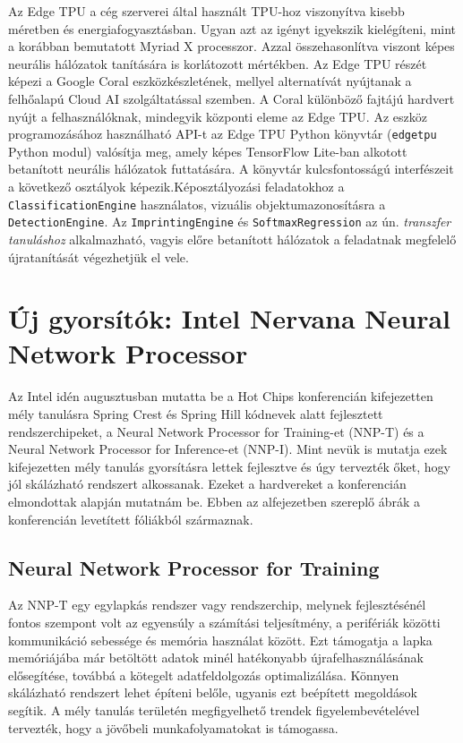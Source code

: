Az Edge TPU a cég szerverei által használt TPU-hoz viszonyítva kisebb méretben és energiafogyasztásban. Ugyan azt az igényt igyekszik kielégíteni, mint a korábban bemutatott Myriad X processzor. Azzal összehasonlítva viszont képes neurális hálózatok tanítására is korlátozott mértékben. Az Edge TPU részét képezi a Google Coral eszközkészletének, mellyel alternatívát nyújtanak a felhőalapú Cloud AI szolgáltatással szemben. A Coral különböző fajtájú hardvert nyújt a felhasználóknak, mindegyik központi eleme az Edge TPU. Az eszköz programozásához használható API-t az Edge TPU Python könyvtár (\verb|edgetpu| Python modul) valósítja meg, amely képes TensorFlow Lite-ban alkotott betanított neurális hálózatok futtatására. A könyvtár kulcsfontosságú interfészeit a következő osztályok képezik.Képosztályozási feladatokhoz a \verb|ClassificationEngine| használatos, vizuális objektumazonosításra a \verb|DetectionEngine|. Az \verb|ImprintingEngine| és \verb|SoftmaxRegression| az ún. \emph{transzfer tanuláshoz} alkalmazható, vagyis előre betanított hálózatok a feladatnak megfelelő újratanítását végezhetjük el vele.


\section{Új gyorsítók: Intel Nervana Neural Network Processor}

Az Intel idén augusztusban mutatta be a Hot Chips konferencián kifejezetten mély tanulásra Spring Crest és Spring Hill kódnevek alatt fejlesztett  rendszerchipeket, a Neural Network Processor for Training-et (NNP-T) és a Neural Network Processor for Inference-et (NNP-I). Mint nevük is mutatja ezek kifejezetten mély tanulás gyorsításra lettek fejlesztve és úgy tervezték őket, hogy jól skálázható rendszert alkossanak. Ezeket a hardvereket a konferencián elmondottak alapján mutatnám be.\cite{yt:nnpt}\cite{yt:nnpi} Ebben az alfejezetben szereplő ábrák a konferencián levetített fóliákból származnak.\cite{slide:nnpt}\cite{slide:nnpi}

\subsection[NNP-T]{Neural Network Processor for Training}
Az NNP-T egy egylapkás rendszer vagy rendszerchip, melynek fejlesztésénél fontos szempont volt az egyensúly a számítási teljesítmény, a perifériák közötti kommunikáció  sebessége és memória használat között. Ezt támogatja 
a lapka memóriájába már betöltött adatok minél hatékonyabb újrafelhasználásának elősegítése, továbbá a kötegelt adatfeldolgozás optimalizálása. Könnyen skálázható rendszert lehet építeni belőle, ugyanis ezt beépített megoldások segítik. A mély tanulás területén megfigyelhető trendek figyelembevételével tervezték, hogy a jövőbeli munkafolyamatokat is támogassa.

